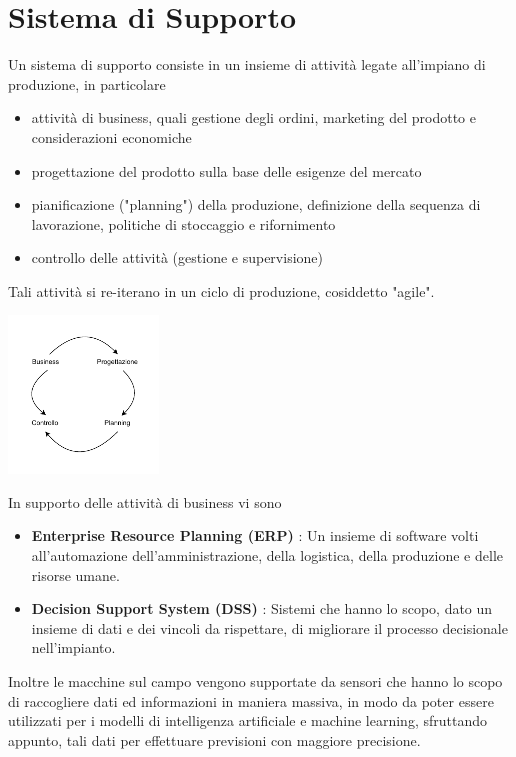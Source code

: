 \documentclass[10pt, letterpaper]{report}
\begin{document}
\section{Sistema di Supporto}
Un sistema di supporto consiste in un insieme di attività legate all'impiano di produzione, in particolare\begin{itemize}
    \item attività di business, quali gestione degli ordini, marketing del prodotto e considerazioni economiche 
    \item progettazione del prodotto sulla base delle esigenze del mercato 
    \item pianificazione ("planning") della produzione, definizione della sequenza di lavorazione, politiche 
    di stoccaggio e rifornimento 
    \item controllo delle attività (gestione e supervisione)
\end{itemize}
Tali attività si re-iterano in un ciclo di produzione, cosiddetto "agile".
\begin{center}
    \includegraphics[width=0.3\textwidth ]{images/sistSupp.pdf}
\end{center}
In supporto delle attività di business vi sono \begin{itemize}
    \item \textbf{Enterprise Resource Planning (ERP)} : Un insieme di software volti all'automazione 
    dell'amministrazione, della logistica, della produzione e delle risorse umane. 
    \item \textbf{Decision Support System (DSS)} : Sistemi che hanno lo scopo, dato un insieme di dati 
    e dei vincoli da rispettare, di migliorare il processo decisionale nell'impianto.
\end{itemize}
Inoltre le macchine sul campo vengono supportate da sensori che hanno lo scopo di raccogliere dati ed informazioni 
in maniera massiva, in modo da poter essere utilizzati per i modelli di intelligenza artificiale e machine learning, 
sfruttando appunto,  tali dati per effettuare previsioni con maggiore precisione.
\end{document}
